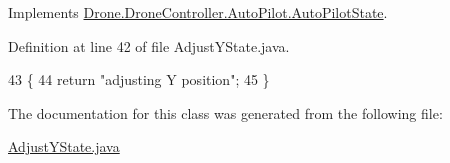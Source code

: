 Implements \hyperlink{interface_drone_1_1_drone_controller_1_1_auto_pilot_1_1_auto_pilot_state_ac30fcebfe95c80d2d66d44dc7d46ebc3}{Drone.\+Drone\+Controller.\+Auto\+Pilot.\+Auto\+Pilot\+State}.



Definition at line 42 of file Adjust\+Y\+State.\+java.


\begin{DoxyCode}
43     \{
44         \textcolor{keywordflow}{return} \textcolor{stringliteral}{"adjusting Y position"};
45     \}
\end{DoxyCode}


The documentation for this class was generated from the following file\+:\begin{DoxyCompactItemize}
\item 
\hyperlink{_adjust_y_state_8java}{Adjust\+Y\+State.\+java}\end{DoxyCompactItemize}

